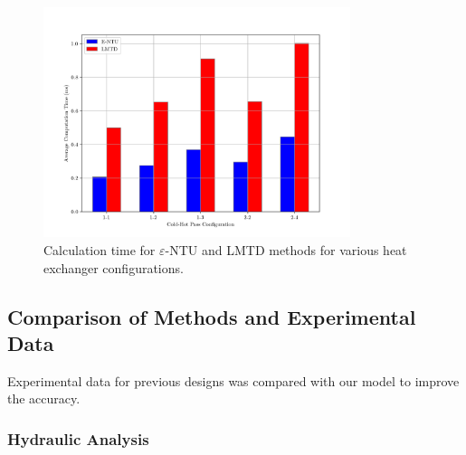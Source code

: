 \documentclass{article}
\begin{document}
\begin{figure}
  \centering
  \includegraphics[width=0.8\textwidth]{entu_lmtd_speed.png}
  \caption{Calculation time for $\varepsilon$-NTU and LMTD methods for various heat exchanger configurations.}
  \label{fig:entu_lmtd_speed}
\end{figure}

\subsection{Comparison of Methods and Experimental Data}

Experimental data for previous designs was compared with our model to improve the accuracy.

\subsubsection{Hydraulic Analysis}
\end{document}
